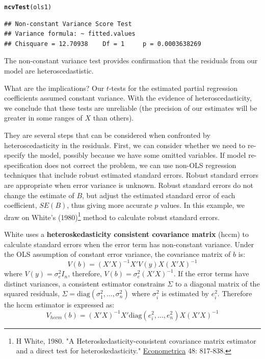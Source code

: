 \documentclass[11pt,openany]{book}\usepackage[]{graphicx}\usepackage[]{color}
\makeatletter
\newcommand{\hlstd}[1]{\textcolor[rgb]{0.345,0.345,0.345}{#1}}%
\newcommand{\hlkwd}[1]{\textcolor[rgb]{0.737,0.353,0.396}{\textbf{#1}}}%
\newenvironment{kframe}{%
 \def\at@end@of@kframe{}%
 \ifinner\ifhmode%
  \def\at@end@of@kframe{\end{minipage}}%
  \begin{minipage}{\columnwidth}%
 \fi\fi%
 \def\FrameCommand##1{\hskip\@totalleftmargin \hskip-\fboxsep
 \colorbox{shadecolor}{##1}\hskip-\fboxsep
     \hskip-\linewidth \hskip-\@totalleftmargin \hskip\columnwidth}%
 \MakeFramed {\advance\hsize-\width
   \@totalleftmargin\z@ \linewidth\hsize
   \@setminipage}}%
 {\par\unskip\endMakeFramed%
 \at@end@of@kframe}
\newenvironment{knitrout}{}{} %
\renewenvironment{knitrout}{\begin{singlespace}}{\end{singlespace}}
\makeatother
\begin{document}
\begin{knitrout}
\color{fgcolor}\begin{kframe}
\begin{alltt}
\hlkwd{ncvTest}\hlstd{(ols1)}
\end{alltt}
\begin{verbatim}
## Non-constant Variance Score Test 
## Variance formula: ~ fitted.values 
## Chisquare = 12.70938    Df = 1     p = 0.0003638269
\end{verbatim}
\end{kframe}
\end{knitrout}
\noindent The non-constant variance test provides confirmation that the residuals from our model are heteroscedastistic.

What are the implications? Our $t$-tests for the estimated partial regression  coefficients assumed constant variance. With the evidence of heteroscedasticity, we conclude that these tests are unreliable (the precision of our estimates will be greater in some ranges of $X$ than others). 

They are several steps that can be considered when confronted by heteroscedasticity in the residuals. First, we can consider whether we need to re-specify the model, possibly because we have some omitted variables. If model re-specification does not correct the problem, we can use non-OLS regression techniques that include robust estimated  standard errors.  Robust standard errors are appropriate when error variance is unknown. Robust standard errors do not change the estimate of $B$, but adjust the estimated standard error of each coefficient, $SE(B)$, thus giving more accurate $p$ values. In this example, we draw on White's (1980)\footnote{H White,  1980.  "A Heteroskedasticity-consistent covariance matrix estimator and a direct test for heteroskedasticity." \underline{Econometrica} 48: 817-838.} method to calculate robust standard errors.  

White uses a \textbf{heteroskedasticity consistent covariance matrix} (hccm) to calculate standard errors when the error term has non-constant variance. Under the OLS assumption of constant error variance, the covariance matrix of $b$ is:
\begin{equation*}
  V(b) = (X'X)^{-1} X'V(y)X(X'X)^{-1}
\end{equation*}
\noindent where $V(y)=\sigma^{2}_{e}I_n$, therefore,
$V(b)=\sigma^{2}_{e}(X'X)^{-1}$. If the error terms have distinct
variances, a consistent estimator constrains $\Sigma$ to a diagonal
matrix of the squared residuals,
$\Sigma=\text{diag}(\sigma^2_1,\ldots,\sigma^2_n)$ where $\sigma^2_i$
is estimated by $e^2_i$. Therefore the hccm estimator is expressed as:  
\begin{equation*}
 V_{hccm}(b) = (X'X)^{-1} X'\text{diag}(e^2_i,\ldots,e^2_n) X(X'X)^{-1} 
\end{equation*}
\end{document}

